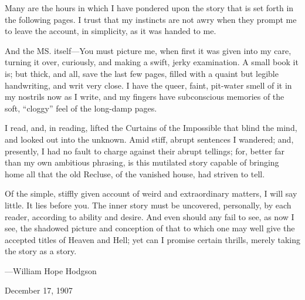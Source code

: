 \documentclass{novel} %
\begin{document}
\label{ch:authors-note}
\begin{ChapterStart}[7]
\null\null
{}
\end{ChapterStart}
Many are the hours in which I have pondered upon the story that is set forth in the following pages. I trust that my instincts are not awry when they prompt me to leave the account, in simplicity, as it was handed to me.\par
And the MS. itself---You must picture me, when first it was given into my care, turning it over, curiously, and making a swift, jerky examination. A small book it is; but thick, and all, save the last few pages, filled with a quaint but legible handwriting, and writ very close. I have the queer, faint, pit-water smell of it in my nostrils now as I write, and my fingers have subconscious memories of the soft, “cloggy” feel of the long-damp pages.\par
I read, and, in reading, lifted the Curtains of the Impossible that blind the mind, and looked out into the unknown. Amid stiff, abrupt sentences I wandered; and, presently, I had no fault to charge against their abrupt tellings; for, better far than my own ambitious phrasing, is this mutilated story capable of bringing home all that the old Recluse, of the vanished house, had striven to tell.\par
Of the simple, stiffly given account of weird and extraordinary matters, I will say little. It lies before you. The inner story must be uncovered, personally, by each reader, according to ability and desire. And even should any fail to see, as now I see, the shadowed picture and conception of that to which one may well give the accepted titles of Heaven and Hell; yet can I promise certain thrills, merely taking the story as a story.\par
\null
\stake\hfill---William Hope Hodgson\par
\stake\hfill December 17, 1907\par
\end{document}
